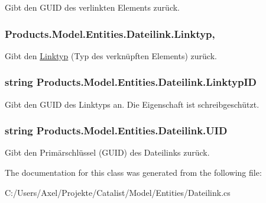 Gibt den G\+U\+ID des verlinkten Elements zurück. 

\subsubsection[{\texorpdfstring{Linktyp}{Linktyp}}]{ Products.\+Model.\+Entities.\+Dateilink.\+Linktyp\hspace{0.3cm}{\ttfamily [get]}, {\ttfamily [set]}}\hypertarget{class_products_1_1_model_1_1_entities_1_1_dateilink_aecde42e401bbbee01b699890d30b9019}{}\label{class_products_1_1_model_1_1_entities_1_1_dateilink_aecde42e401bbbee01b699890d30b9019}


Gibt den \hyperlink{class_products_1_1_model_1_1_entities_1_1_linktyp}{Linktyp} (Typ des verknüpften Elements) zurück. 

\subsubsection[{\texorpdfstring{Linktyp\+ID}{LinktypID}}]{\setlength{\rightskip}{0pt plus 5cm}string Products.\+Model.\+Entities.\+Dateilink.\+Linktyp\+ID\hspace{0.3cm}{\ttfamily [get]}}\hypertarget{class_products_1_1_model_1_1_entities_1_1_dateilink_aaceb6ffc7565c9f38d839e027e18ac7b}{}\label{class_products_1_1_model_1_1_entities_1_1_dateilink_aaceb6ffc7565c9f38d839e027e18ac7b}


Gibt den G\+U\+ID des Linktyps an. Die Eigenschaft ist schreibgeschützt. 

\subsubsection[{\texorpdfstring{U\+ID}{UID}}]{\setlength{\rightskip}{0pt plus 5cm}string Products.\+Model.\+Entities.\+Dateilink.\+U\+ID\hspace{0.3cm}{\ttfamily [get]}}\hypertarget{class_products_1_1_model_1_1_entities_1_1_dateilink_a65bccfd6a82f64537ccde27720c9a908}{}\label{class_products_1_1_model_1_1_entities_1_1_dateilink_a65bccfd6a82f64537ccde27720c9a908}


Gibt den Primärschlüssel (G\+U\+ID) des Dateilinks zurück. 



The documentation for this class was generated from the following file\+:\begin{DoxyCompactItemize}
\item 
C\+:/\+Users/\+Axel/\+Projekte/\+Catalist/\+Model/\+Entities/Dateilink.\+cs\end{DoxyCompactItemize}
